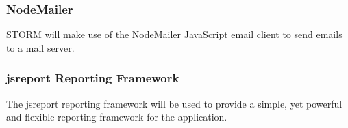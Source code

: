 \subsubsection{NodeMailer}
STORM will make use of the NodeMailer JavaScript email client to send emails to a mail server.

\subsubsection{jsreport Reporting Framework}
The jsreport reporting framework will be used to provide a simple, yet powerful and flexible reporting framework for the application.
